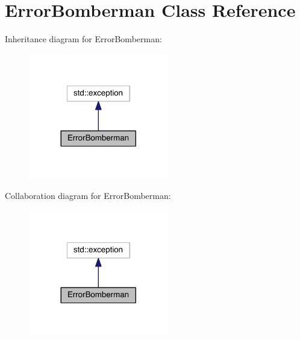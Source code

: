 \hypertarget{class_error_bomberman}{}\section{Error\+Bomberman Class Reference}
\label{class_error_bomberman}


Inheritance diagram for Error\+Bomberman\+:\nopagebreak
\begin{figure}[H]
\begin{center}
\leavevmode
\includegraphics[width=173pt]{class_error_bomberman__inherit__graph}
\end{center}
\end{figure}


Collaboration diagram for Error\+Bomberman\+:\nopagebreak
\begin{figure}[H]
\begin{center}
\leavevmode
\includegraphics[width=173pt]{class_error_bomberman__coll__graph}
\end{center}
\end{figure}
